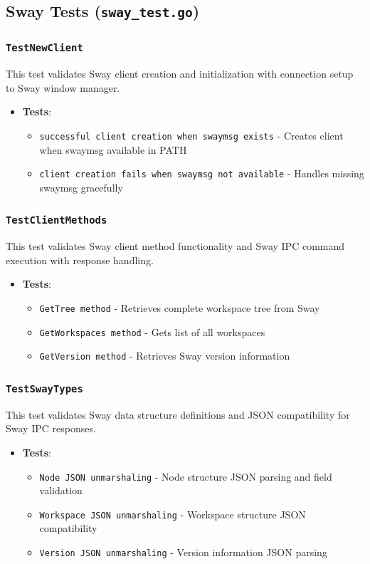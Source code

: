 \subsection{Sway Tests (\texttt{sway\_test.go})}

\subsubsection*{\texttt{TestNewClient}}
This test validates Sway client creation and initialization with connection setup to Sway window manager.
\begin{itemize}
    \item \textbf{Tests}:
    \begin{itemize}
        \item \texttt{successful client creation when swaymsg exists} - Creates client when swaymsg available in PATH
        \item \texttt{client creation fails when swaymsg not available} - Handles missing swaymsg gracefully
    \end{itemize}
\end{itemize}

\subsubsection*{\texttt{TestClientMethods}}
This test validates Sway client method functionality and Sway IPC command execution with response handling.
\begin{itemize}
    \item \textbf{Tests}:
    \begin{itemize}
        \item \texttt{GetTree method} - Retrieves complete workspace tree from Sway
        \item \texttt{GetWorkspaces method} - Gets list of all workspaces
        \item \texttt{GetVersion method} - Retrieves Sway version information
    \end{itemize}
\end{itemize}

\subsubsection*{\texttt{TestSwayTypes}}
This test validates Sway data structure definitions and JSON compatibility for Sway IPC responses.
\begin{itemize}
    \item \textbf{Tests}:
    \begin{itemize}
        \item \texttt{Node JSON unmarshaling} - Node structure JSON parsing and field validation
        \item \texttt{Workspace JSON unmarshaling} - Workspace structure JSON compatibility
        \item \texttt{Version JSON unmarshaling} - Version information JSON parsing
    \end{itemize}
\end{itemize}
